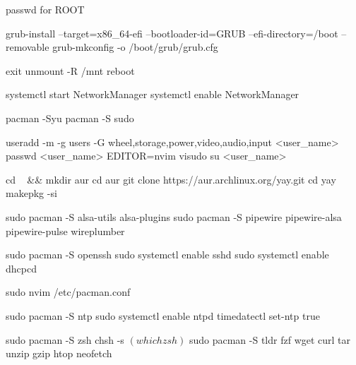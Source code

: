 passwd for ROOT


grub-install --target=x86_64-efi --bootloader-id=GRUB --efi-directory=/boot --removable
grub-mkconfig -o /boot/grub/grub.cfg

exit
unmount -R /mnt
reboot

systemctl start NetworkManager
systemctl enable NetworkManager

pacman -Syu
pacman -S sudo

useradd -m -g users -G wheel,storage,power,video,audio,input <user_name>
passwd <user_name>
EDITOR=nvim visudo
su <user_name>


cd ~ && mkdir aur 
cd aur
git clone https://aur.archlinux.org/yay.git 
cd yay
makepkg -si

sudo pacman -S alsa-utils alsa-plugins
sudo pacman -S pipewire pipewire-alsa pipewire-pulse wireplumber


sudo pacman -S openssh
sudo systemctl enable sshd
sudo systemctl enable dhcpcd



sudo nvim /etc/pacman.conf


sudo pacman -S ntp
sudo systemctl enable ntpd
timedatectl set-ntp true


sudo pacman -S zsh
chsh -s $(which zsh)

$ sudo pacman -S tldr fzf wget curl tar unzip gzip htop neofetch
